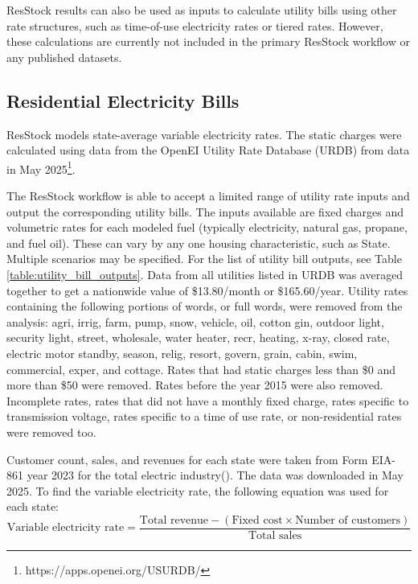 ResStock results can also be used as inputs to calculate utility bills using other rate structures, such as time-of-use electricity rates or tiered rates. However, these calculations are currently not included in the primary ResStock workflow or any published datasets.

\subsection{Residential Electricity Bills}
ResStock models state-average variable electricity rates. The static charges were calculated using data from the OpenEI Utility Rate Database (URDB) from data in May 2025\footnote{https://apps.openei.org/USURDB/}.

The ResStock workflow is able to accept a limited range of utility rate inputs and output the corresponding utility bills. The inputs available are fixed charges and volumetric rates for each modeled fuel (typically electricity, natural gas, propane, and fuel oil). These can vary by any one housing characteristic, such as State. Multiple scenarios may be specified. For the list of utility bill outputs, see Table \ref{table:utility_bill_outputs}. Data from all utilities listed in URDB was averaged together to get a nationwide value of \$13.80/month or \$165.60/year. Utility rates containing the following portions of words, or full words, were removed from the analysis: agri, irrig, farm, pump, snow, vehicle, oil, cotton gin, outdoor light, security light, street, wholesale, water heater, recr, heating, x-ray, closed rate, electric motor standby, season, relig, resort, govern, grain, cabin, swim, commercial, exper, and cottage. Rates that had static charges less than \$0 and more than \$50 were removed. Rates before the year 2015 were also removed. Incomplete rates, rates that did not have a monthly fixed charge, rates specific to transmission voltage, rates specific to a time of use rate, or non-residential rates were removed too.

Customer count, sales, and revenues for each state were taken from Form EIA-861 year 2023 for the total electric industry(\cite{EIA_861_electricity}). The data was downloaded in May 2025. To find the variable electricity rate, the following equation was used for each state:
\begin{equation}
\label{eq:avg_var_electricity_rate}
\text{Variable electricity rate} = \frac{\text{Total revenue} - (\text{Fixed cost} \times \text{Number of customers})}{\text{Total sales}}
\end{equation}

